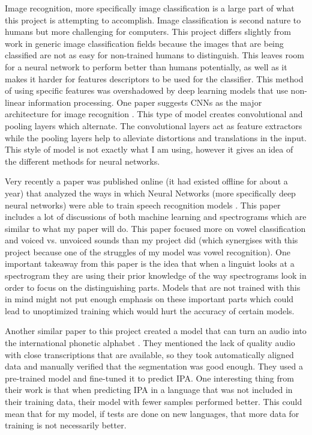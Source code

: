 \documentclass[10pt,twocolumn]{article}
\begin{document}
Image recognition, more specifically image classification is a large part of what this project is attempting to accomplish. Image classification is second nature to humans but more challenging for computers. This project differs slightly from work in generic image classification fields because the images that are being classified are not as easy for non-trained humans to distinguish. This leaves room for a neural network to perform better than humans potentially, as well as it makes it harder for features descriptors to be used for the classifier. This method of using specific features was overshadowed by deep learning models that use non-linear information processing. One paper suggests CNNs as the major architecture for image recognition \cite{CNN}. This type of model creates convolutional and pooling layers which alternate. The convolutional layers act as feature extractors while the pooling layers help to alleviate distortions and translations in the input. This style of model is not exactly what I am using, however it gives an idea of the different methods for neural networks.

Very recently a paper was published online (it had existed offline for about a year) that analyzed the ways in which Neural Networks (more specifically deep neural networks) were able to train speech recognition models \cite{SpectrogramML}. This paper includes a lot of discussions of both machine learning and spectrograms which are similar to what my paper will do. This paper focused more on vowel classification and voiced vs. unvoiced sounds than my project did (which synergises with this project because one of the struggles of my model was vowel recognition). One important takeaway from this paper is the idea that when a linguist looks at a spectrogram they are using their prior knowledge of the way spectrograms look in order to focus on the distinguishing parts. Models that are not trained with this in mind might not put enough emphasis on these important parts which could lead to unoptimized training which would hurt the accuracy of certain models.

Another similar paper to this project created a model that can turn an audio into the international phonetic alphabet \cite{UniversalIPA}. They mentioned the lack of quality audio with close transcriptions that are available, so they took automatically aligned data and manually verified that the segmentation was good enough. They used a pre-trained model and fine-tuned it to predict IPA. One interesting thing from their work is that when predicting IPA in a language that was not included in their training data, their model with fewer samples performed better. This could mean that for my model, if tests are done on new languages, that more data for training is not necessarily better.
\end{document}
